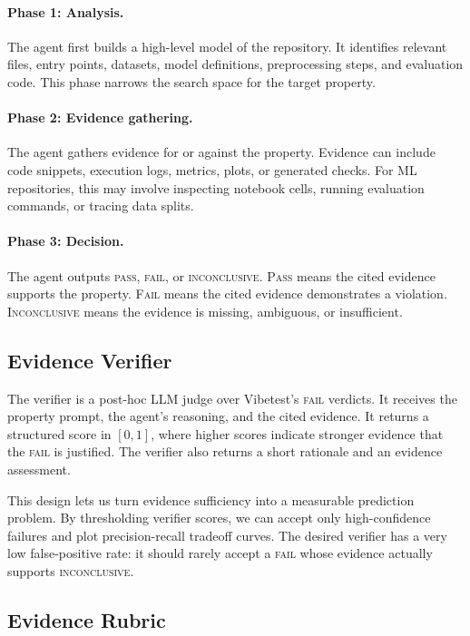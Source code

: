 \documentclass[11pt]{article}
\begin{document}
\paragraph{Phase 1: Analysis.}
The agent first builds a high-level model of the repository.
It identifies relevant files, entry points, datasets, model definitions, preprocessing steps, and evaluation code.
This phase narrows the search space for the target property.

\paragraph{Phase 2: Evidence gathering.}
The agent gathers evidence for or against the property.
Evidence can include code snippets, execution logs, metrics, plots, or generated checks.
For ML repositories, this may involve inspecting notebook cells, running evaluation commands, or tracing data splits.

\paragraph{Phase 3: Decision.}
The agent outputs \textsc{pass}, \textsc{fail}, or \textsc{inconclusive}.
\textsc{Pass} means the cited evidence supports the property.
\textsc{Fail} means the cited evidence demonstrates a violation.
\textsc{Inconclusive} means the evidence is missing, ambiguous, or insufficient.

\subsection{Evidence Verifier}

The verifier is a post-hoc LLM judge over Vibetest's \textsc{fail} verdicts.
It receives the property prompt, the agent's reasoning, and the cited evidence.
It returns a structured score in $[0,1]$, where higher scores indicate stronger evidence that the \textsc{fail} is justified.
The verifier also returns a short rationale and an evidence assessment.

This design lets us turn evidence sufficiency into a measurable prediction problem.
By thresholding verifier scores, we can accept only high-confidence failures and plot precision-recall tradeoff curves.
The desired verifier has a very low false-positive rate: it should rarely accept a \textsc{fail} whose evidence actually supports \textsc{inconclusive}.

\subsection{Evidence Rubric}
\label{sec:rubric}
\end{document}
